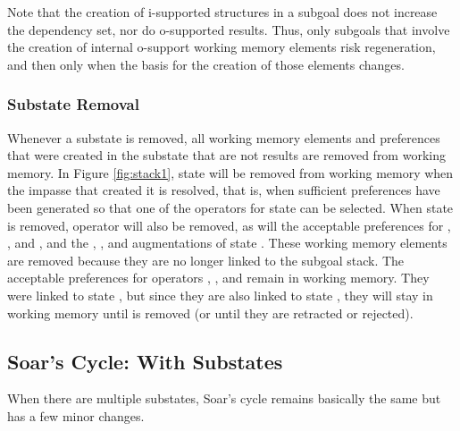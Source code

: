 Note that the creation of i-supported structures in a subgoal does not increase the dependency set, nor do o-supported results.  Thus, only subgoals that involve the creation of internal o-support working memory elements risk regeneration, and then only when the basis for the creation of those elements changes.

\subsubsection*{Substate Removal}

Whenever a substate is removed, all working memory elements and preferences that were created in the substate that are not results are removed from working memory. In Figure \ref{fig:stack1}, state  will be removed from working memory when the impasse that created it is resolved, that is, when sufficient preferences have been generated so that one of the operators for state  can be selected. When state  is removed, operator  will also be removed, as will the acceptable preferences for , , and , and the , , and  augmentations of state . These working memory elements are removed because they are no longer linked to the subgoal stack. The acceptable preferences for operators , , and  remain in working memory. They were linked to state , but since they are also linked to state , they will stay in working memory until  is removed (or until they are retracted or rejected).

\subsection{Soar's Cycle: With Substates}
\label{ARCH-decision-substates}

When there are multiple substates, Soar's cycle remains basically the same but has a few minor changes.  



